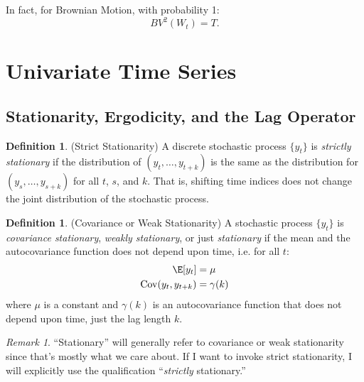 \documentclass[12pt]{article}
\theoremstyle{plain}
\theoremstyle{definition}
\newtheorem{defn}[thm]{Definition}
\theoremstyle{remark}
\newtheorem*{rmk}{Remark}
\newcommand{\Cov}{\operatorname{Cov}}
\begin{document}
      In fact, for Brownian Motion, with probability 1:
	 \[BV^2(W_t) = T.\]





\clearpage
\section{Univariate Time Series}



\subsection{Stationarity, Ergodicity, and the Lag Operator}

\begin{defn}(Strict Stationarity)
A discrete stochastic process $\{y_t\}$ is \emph{strictly stationary} if
the distribution of $(y_t,\ldots,y_{t+k})$ is the same as the
distribution for $(y_s,\ldots,y_{s+k})$ for all $t$, $s$, and $k$. That
is, shifting time indices does not change the joint distribution of the
stochastic process.
\end{defn}

\begin{defn}(Covariance or Weak Stationarity)
A stochastic process $\{y_t\}$ is \emph{covariance stationary},
\emph{weakly stationary}, or just \emph{stationary} if the mean and the
autocovariance function does not depend upon time, i.e. for all $t$:
\begin{align*}
  \E[y_t] &= \mu \\
  \Cov(y_t,y_{t+k}) &= \gamma(k)
\end{align*}
where $\mu$ is a constant and $\gamma(k)$ is an autocovariance function
that does not depend upon time, just the lag length $k$.
\end{defn}
\begin{rmk}
``Stationary'' will generally refer to covariance or weak stationarity
since that's mostly what we care about. If I want to invoke strict
stationarity, I will explicitly use the qualification ``\emph{strictly}
stationary.''
\end{rmk}
\end{document}

